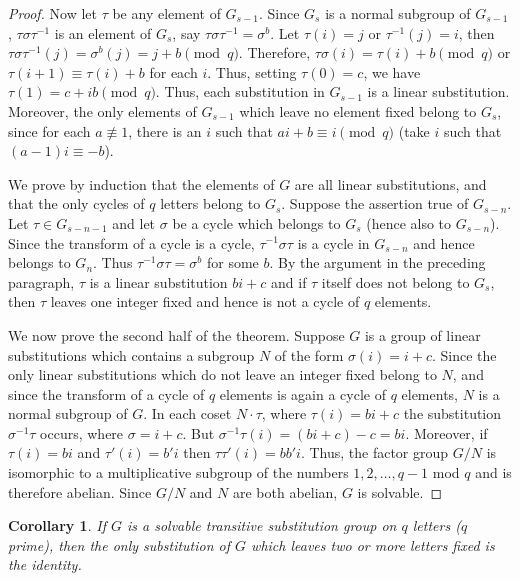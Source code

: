 \documentclass[10pt,leqno]{article}
\newtheorem{coro}{Corollary}
\theoremstyle{definition}
\begin{document}
\begin{proof}
Now let $\tau$ be any element of $G_{s-1}$.
Since $G_s$ is a normal subgroup of $G_{s-1}$, $\tau \sigma \tau^{-1}$ is an element of $G_s$, say $\tau \sigma \tau^{-1} = \sigma^b$.
Let $\tau(i) = j$ or $\tau^{-1}(j) = i$, then $\tau \sigma \tau^{-1}(j) = \sigma^b(j) = j + b \pmod q$.
Therefore, $\tau\sigma(i) = \tau(i) + b \pmod q$ or $\tau(i+1) \equiv \tau(i) + b$ for each $i$.
Thus, setting $\tau(0) = c$, we have $\tau(1) = c + ib \pmod q$.
Thus, each substitution in $G_{s-1}$ is a linear substitution.
Moreover, the only elements of $G_{s-1}$ which leave no element fixed belong to $G_s$, since for each $a \not\equiv 1$, there is an $i$ such that $ai + b \equiv i \pmod q$ (take $i$ such that $(a-1)i \equiv -b$).

We prove by induction that the elements of $G$ are all linear substitutions, and that the only cycles of $q$ letters belong to $G_s$.
Suppose the assertion true of $G_{s-n}$.
Let $\tau \in G_{s-n-1}$ and let $\sigma$ be a cycle which belongs to $G_s$ (hence also to $G_{s-n}$).
Since the transform of a cycle is a cycle, $\tau^{-1} \sigma \tau$ is a cycle in $G_{s-n}$ and hence belongs to $G_n$.
Thus $\tau^{-1} \sigma\tau = \sigma^b$ for some $b$.
By the argument in the preceding paragraph, $\tau$ is a linear substitution $bi + c$ and if $\tau$ itself does not belong to $G_s$, then $\tau$ leaves one integer fixed and hence is not a cycle of $q$ elements.

We now prove the second half of the theorem.
Suppose $G$ is a group of linear substitutions which contains a subgroup $N$ of the form $\sigma(i) = i + c$.
Since the only linear substitutions which do not leave an integer fixed belong to $N$, and since the transform of a cycle of $q$ elements is again a cycle of $q$ elements, $N$ is a normal subgroup of $G$.
In each coset $N \cdot \tau$, where $\tau(i) = bi + c$ the substitution $\sigma^{-1}\tau$ occurs, where $\sigma = i + c$.
But $\sigma^{-1}\tau(i) = (bi + c) - c = bi$.
Moreover, if $\tau(i) = bi$ and $\tau'(i) = b'i$ then $\tau\tau'(i) = bb'i$.
Thus, the factor group $G/N$ is isomorphic to a multiplicative subgroup of the numbers $1,2,\ldots,q-1$ mod $q$ and is therefore abelian.
Since $G/N$ and $N$ are both abelian, $G$ is solvable.
\end{proof}


\begin{coro}
\label{coro:III.1.2}
If $G$ is a solvable transitive substitution group on $q$ letters ($q$ prime), then the only substitution of $G$ which leaves two or more letters fixed is the identity.
\end{coro}
\end{document}
